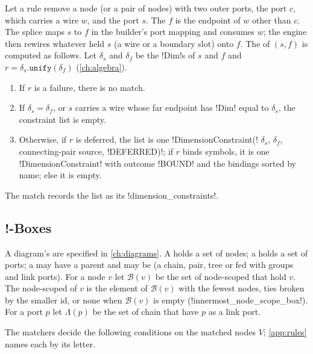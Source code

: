 \begin{definition}[Splice]\label{def:rules-splice}
Let a rule remove a node (or a pair of nodes) with two outer ports, the  port $c$, which carries a wire $w$, and the  port $s$. The  $f$ is the endpoint of $w$ other than $c$. The splice maps $s$ to $f$ in the builder's port mapping and consumes $w$; the engine then rewires whatever held $s$ (a wire or a boundary slot) onto $f$. The  of $(s,f)$ is computed as follows. Let $\delta_s$ and $\delta_f$ be the \py!Dim!s of $s$ and $f$ and $r=\delta_s.\mathtt{unify}(\delta_f)$ (\cref{ch:algebra}).
\begin{enumerate}
\item If $r$ is a failure, there is no match.
\item If $\delta_s=\delta_f$, or $s$ carries a wire whose far endpoint has \py!Dim! equal to $\delta_s$, the constraint list is empty.
\item Otherwise, if $r$ is deferred, the list is one \py!DimensionConstraint(! $\delta_s$, $\delta_f$, connecting-pair source, \py!DEFERRED)!; if $r$ binds symbols, it is one \py!DimensionConstraint! with outcome \py!BOUND! and the bindings sorted by name; else it is empty.
\end{enumerate}
The match records the list as its \py!dimension_constraints!.
\end{definition}

\subsection{!-Boxes}\label{sec:rules-boxes}

A diagram's \bboxes{} are specified in \cref{ch:diagrams}. A  \bbox{} holds a set of nodes; a  \bbox{} holds a set of ports; a \bbox{} may have a parent and may be  (a chain, pair, tree or fed \bbox{} with groups and link ports). For a node $v$ let $\mathcal{B}(v)$ be the set of node-scoped \bboxes{} that hold $v$. The  node-scoped \bbox{} of $v$ is the element of $\mathcal{B}(v)$ with the fewest nodes, ties broken by the smaller \bbox{} id, or none when $\mathcal{B}(v)$ is empty (\py!innermost_node_scope_box!). For a port $p$ let $\Lambda(p)$ be the set of chain \bboxes{} that have $p$ as a link port.

The matchers decide the following \bbox{} conditions on the matched nodes $V$; \cref{app:rules} names each by its letter.

